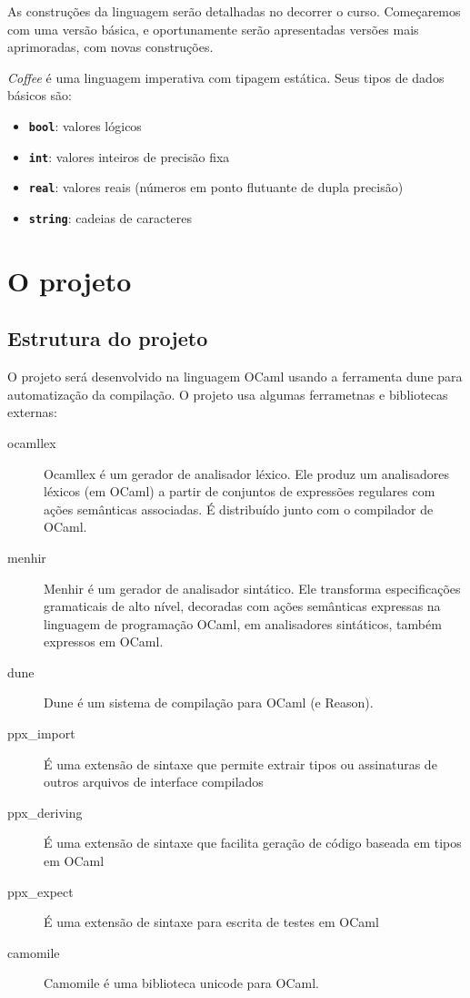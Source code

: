 \documentclass[a4paper,11pt,brazil]{article}
\newcommand{\lang}{\textsl{Coffee}}
\begin{document}
As construções da linguagem serão detalhadas no decorrer o
curso. Começaremos com uma versão básica, e oportunamente serão
apresentadas versões mais aprimoradas, com novas construções.

\lang{} é uma linguagem imperativa com tipagem estática. Seus tipos de
dados básicos são:
\begin{itemize}
  \item \textbf{\texttt{bool}}: valores lógicos
  \item \textbf{\texttt{int}}: valores inteiros de precisão fixa
  \item \textbf{\texttt{real}}: valores reais (números em ponto
  flutuante de dupla precisão)
  \item \textbf{\texttt{string}}: cadeias de caracteres
\end{itemize}


\section{O projeto}

\subsection{Estrutura do projeto}

O projeto será desenvolvido na linguagem OCaml usando a ferramenta
dune para automatização da compilação. O projeto usa algumas
ferrametnas e bibliotecas externas:
\begin{description}
  \item[ocamllex] Ocamllex é um gerador de analisador léxico. Ele
  produz um analisadores léxicos (em OCaml) a partir de conjuntos de
  expressões regulares com ações semânticas associadas. É distribuído
  junto com o compilador de OCaml.
  
  \item[menhir] Menhir é um gerador de analisador sintático. Ele
  transforma especificações gramaticais de alto nível, decoradas com
  ações semânticas expressas na linguagem de programação OCaml, em
  analisadores sintáticos, também expressos em OCaml.

  \item[dune] Dune é um sistema de compilação para OCaml (e Reason).

  \item[ppx_import] É uma extensão de sintaxe que permite extrair
  tipos ou assinaturas de outros arquivos de interface compilados

  \item[ppx_deriving] É uma extensão de sintaxe que facilita geração
  de código baseada em tipos em OCaml

  \item[ppx_expect] É uma extensão de sintaxe para escrita de testes
  em OCaml

  \item[camomile] Camomile é uma biblioteca unicode para OCaml.  
\end{description}
  
\end{document}
